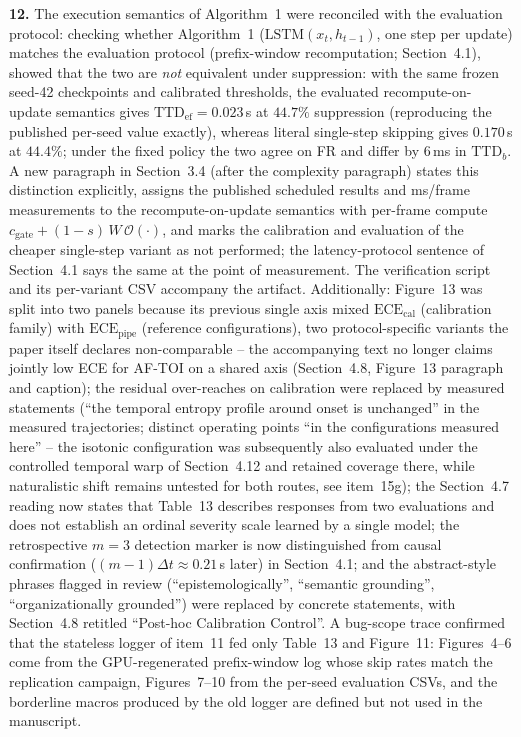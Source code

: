 \documentclass[1p,12pt,authoryear]{elsarticle}
\begin{document}
\vspace{2mm}
\noindent \textbf{12.} The execution semantics of Algorithm~1 were reconciled with the evaluation protocol: checking whether Algorithm~1 ($\mathrm{LSTM}(x_t, h_{t-1})$, one step per update) matches the evaluation protocol (prefix-window recomputation; Section~4.1), showed that the two are \emph{not} equivalent under suppression: with the same frozen seed-42 checkpoints and calibrated thresholds, the evaluated recompute-on-update semantics gives $\mathrm{TTD}_{\mathrm{ef}} = 0.023$\,s at $44.7\%$ suppression (reproducing the published per-seed value exactly), whereas literal single-step skipping gives $0.170$\,s at $44.4\%$; under the fixed policy the two agree on FR and differ by $6$\,ms in $\mathrm{TTD}_b$. A new paragraph in Section~3.4 (after the complexity paragraph) states this distinction explicitly, assigns the published scheduled results and ms/frame measurements to the recompute-on-update semantics with per-frame compute $c_{\mathrm{gate}} + (1-s)\,W\,\mathcal{O}(\cdot)$, and marks the calibration and evaluation of the cheaper single-step variant as not performed; the latency-protocol sentence of Section~4.1 says the same at the point of measurement. The verification script and its per-variant CSV accompany the artifact. Additionally: Figure~13 was split into two panels because its previous single axis mixed $\mathrm{ECE}_{\mathrm{cal}}$ (calibration family) with $\mathrm{ECE}_{\mathrm{pipe}}$ (reference configurations), two protocol-specific variants the paper itself declares non-comparable -- the accompanying text no longer claims jointly low ECE for AF-TOI on a shared axis (Section~4.8, Figure~13 paragraph and caption); the residual over-reaches on calibration were replaced by measured statements (``the temporal entropy profile around onset is unchanged'' in the measured trajectories; distinct operating points ``in the configurations measured here'' -- the isotonic configuration was subsequently also evaluated under the controlled temporal warp of Section~4.12 and retained coverage there, while naturalistic shift remains untested for both routes, see item~15g); the Section~4.7 reading now states that Table~13 describes responses from two evaluations and does not establish an ordinal severity scale learned by a single model; the retrospective $m{=}3$ detection marker is now distinguished from causal confirmation ($(m{-}1)\Delta t \approx 0.21$\,s later) in Section~4.1; and the abstract-style phrases flagged in review (``epistemologically'', ``semantic grounding'', ``organizationally grounded'') were replaced by concrete statements, with Section~4.8 retitled ``Post-hoc Calibration Control''. A bug-scope trace confirmed that the stateless logger of item~11 fed only Table~13 and Figure~11: Figures~4--6 come from the GPU-regenerated prefix-window log whose skip rates match the replication campaign, Figures~7--10 from the per-seed evaluation CSVs, and the borderline macros produced by the old logger are defined but not used in the manuscript.
\end{document}
